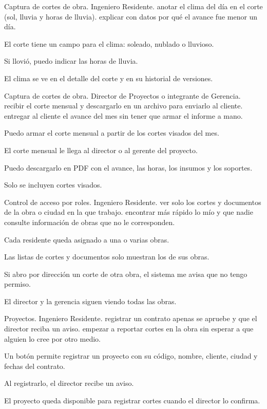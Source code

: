 \documentclass[11pt]{article}
\begin{document}
{Captura de cortes de obra.}
{Ingeniero Residente.}
{anotar el clima del día en el corte (sol, lluvia y horas de lluvia).}
{explicar con datos por qué el avance fue menor un día.}
{\item El corte tiene un campo para el clima: soleado, nublado o lluvioso.
\item Si llovió, puedo indicar las horas de lluvia.
\item El clima se ve en el detalle del corte y en su historial de versiones.}

{Captura de cortes de obra.}
{Director de Proyectos o integrante de Gerencia.}
{recibir el corte mensual y descargarlo en un archivo para enviarlo al cliente.}
{entregar al cliente el avance del mes sin tener que armar el informe a mano.}
{\item Puedo armar el corte mensual a partir de los cortes visados del mes.
\item El corte mensual le llega al director o al gerente del proyecto.
\item Puedo descargarlo en PDF con el avance, las horas, los insumos y los soportes.
\item Solo se incluyen cortes visados.}

{Control de acceso por roles.}
{Ingeniero Residente.}
{ver solo los cortes y documentos de la obra o ciudad en la que trabajo.}
{encontrar más rápido lo mío y que nadie consulte información de obras que no le corresponden.}
{\item Cada residente queda asignado a una o varias obras.
\item Las listas de cortes y documentos solo muestran los de sus obras.
\item Si abro por dirección un corte de otra obra, el sistema me avisa que no tengo permiso.
\item El director y la gerencia siguen viendo todas las obras.}

{Proyectos.}
{Ingeniero Residente.}
{registrar un contrato apenas se apruebe y que el director reciba un aviso.}
{empezar a reportar cortes en la obra sin esperar a que alguien lo cree por otro medio.}
{\item Un botón permite registrar un proyecto con su código, nombre, cliente, ciudad y fechas del contrato.
\item Al registrarlo, el director recibe un aviso.
\item El proyecto queda disponible para registrar cortes cuando el director lo confirma.}
\end{document}
